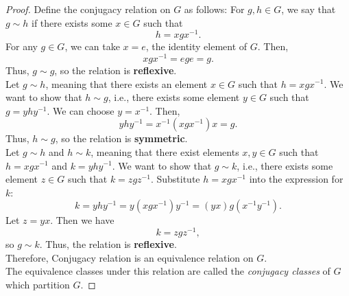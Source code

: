 \begin{proof}
    Define the conjugacy relation on \( G \) as follows: For \( g, h \in G \), we say that \( g \sim h \) if there exists some \( x \in G \) such that
    \[
    h = xgx^{-1}.
    \]
    For any \( g \in G \), we can take \( x = e \), the identity element of \( G \). Then,
    \[
    xgx^{-1} = ege = g.
    \]
    Thus, \( g \sim g \), so the relation is \textbf{reflexive}.\\
    Let \( g \sim h \), meaning that there exists an element \( x \in G \) such that \( h = xgx^{-1} \). We want to show that \( h \sim g \), i.e., there exists some element \( y \in G \) such that \( g = yhy^{-1} \).
    We can choose \( y = x^{-1} \). Then,
    \[
    yhy^{-1} = x^{-1}(xgx^{-1})x = g.
    \]
    Thus, \( h \sim g \), so the relation is \textbf{symmetric}.\\
    Let \( g \sim h \) and \( h \sim k \), meaning that there exist elements \( x, y \in G \) such that \( h = xgx^{-1} \) and \( k = yhy^{-1} \). We want to show that \( g \sim k \), i.e., there exists some element \( z \in G \) such that \( k = zgz^{-1} \).
    Substitute \( h = xgx^{-1} \) into the expression for \( k \):
    \[
    k = yhy^{-1} = y(xgx^{-1})y^{-1} = (yx)g(x^{-1}y^{-1}).
    \]
    Let \( z = yx \). Then we have
    \[
    k = zgz^{-1},
    \]
    so \( g \sim k \). Thus, the relation is \textbf{reflexive}.\\
    Therefore, Conjugacy relation is an equivalence relation on \( G \).\\
    The equivalence classes under this relation are called the \textit{conjugacy classes} of \( G \) which partition $G$.
\end{proof}
